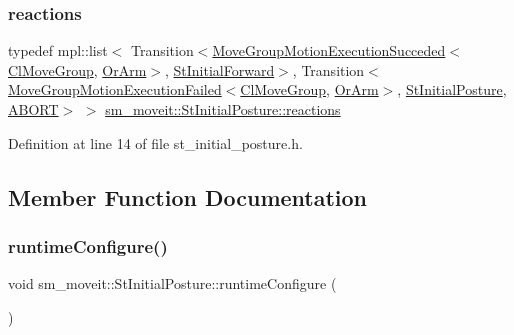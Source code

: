 \subsubsection{\texorpdfstring{reactions}{reactions}}
{\footnotesize\ttfamily typedef mpl\+::list$<$ Transition$<$\hyperlink{structmove__group__interface__client_1_1MoveGroupMotionExecutionSucceded}{Move\+Group\+Motion\+Execution\+Succeded}$<$\hyperlink{classmove__group__interface__client_1_1ClMoveGroup}{Cl\+Move\+Group}, \hyperlink{classsm__moveit_1_1OrArm}{Or\+Arm}$>$, \hyperlink{structsm__moveit_1_1StInitialForward}{St\+Initial\+Forward}$>$, Transition$<$\hyperlink{structmove__group__interface__client_1_1MoveGroupMotionExecutionFailed}{Move\+Group\+Motion\+Execution\+Failed}$<$\hyperlink{classmove__group__interface__client_1_1ClMoveGroup}{Cl\+Move\+Group}, \hyperlink{classsm__moveit_1_1OrArm}{Or\+Arm}$>$, \hyperlink{structsm__moveit_1_1StInitialPosture}{St\+Initial\+Posture}, \hyperlink{classABORT}{A\+B\+O\+RT}$>$ $>$ \hyperlink{structsm__moveit_1_1StInitialPosture_ab6ac709f3c2758548901bc425791149c}{sm\+\_\+moveit\+::\+St\+Initial\+Posture\+::reactions}}



Definition at line 14 of file st\+\_\+initial\+\_\+posture.\+h.



\subsection{Member Function Documentation}
\mbox{\label{structsm__moveit_1_1StInitialPosture_af6985ad418eb655f35bd182973d7234a}} 
\subsubsection{\texorpdfstring{runtime\+Configure()}{runtimeConfigure()}}
{\footnotesize\ttfamily void sm\+\_\+moveit\+::\+St\+Initial\+Posture\+::runtime\+Configure (\begin{DoxyParamCaption}{ }\end{DoxyParamCaption})\hspace{0.3cm}{\ttfamily [inline]}}



